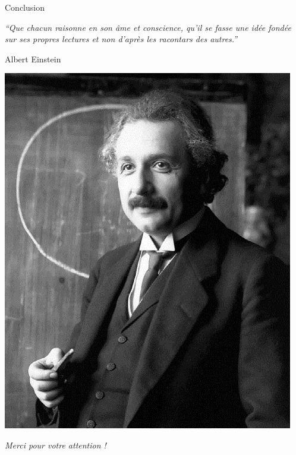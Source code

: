 \documentclass[usenames, dvipsnames]{beamer}
\begin{document}
\begin{frame}[plain]{Conclusion}
\begin{center}
\itshape
``Que chacun raisonne en son âme et conscience, qu'il se fasse une idée fondée sur ses propres lectures et non d'après les racontars des autres.''
\end{center}

\begin{flushright}
Albert Einstein
\end{flushright}

\begin{center}
\includegraphics[scale=0.2]{images/Einstein.jpg}
\end{center}
\end{frame}


\begin{frame}[plain]
\vspace{2cm}
{\huge\color{umons-red}
\begin{center}
\textit{\textrm{Merci pour votre attention !}}
\end{center}}
\end{frame}
\end{document}
